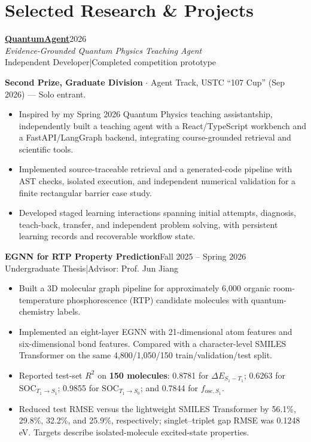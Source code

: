 \documentclass[11pt,a4paper]{article}
\newcommand{\entry}[3]{\textbf{#1}\hfill {\small #2}\\{\small #3}\par}
\begin{document}
\section{Selected Research \& Projects}
\textbf{\href{https://github.com/techandscixie2005/Quantum-Agent}{QuantumAgent}}\hfill 2026\\
\textit{Evidence-Grounded Quantum Physics Teaching Agent}\\
{\small Independent Developer\enspace |\enspace Completed competition prototype}\par
{\small\textbf{Second Prize, Graduate Division} $\cdot$ Agent Track, USTC ``107 Cup'' (Sep 2026) --- Solo entrant.}
\begin{itemize}
    \item Inspired by my Spring 2026 Quantum Physics teaching assistantship, independently built a teaching agent with a React/TypeScript workbench and a FastAPI/LangGraph backend, integrating course-grounded retrieval and scientific tools.
    \item Implemented source-traceable retrieval and a generated-code pipeline with AST checks, isolated execution, and independent numerical validation for a finite rectangular barrier case study.
    \item Developed staged learning interactions spanning initial attempts, diagnosis, teach-back, transfer, and independent problem solving, with persistent learning records and recoverable workflow state.
\end{itemize}
\vspace{5pt}
\entry{EGNN for RTP Property Prediction}{Fall 2025 -- Spring 2026}{Undergraduate Thesis\enspace |\enspace Advisor: Prof. Jun Jiang}
\begin{itemize}
    \item Built a 3D molecular graph pipeline for approximately 6,000 organic room-temperature phosphorescence (RTP) candidate molecules with quantum-chemistry labels.
    \item Implemented an eight-layer EGNN with 21-dimensional atom features and six-dimensional bond features. Compared with a character-level SMILES Transformer on the same 4,800/1,050/150 train/validation/test split.
    \item Reported test-set $R^2$ on \textbf{150 molecules}: 0.8781 for $\Delta E_{S_1-T_1}$; 0.6263 for $\mathrm{SOC}_{T_1\to S_1}$; 0.9855 for $\mathrm{SOC}_{T_1\to S_0}$; and 0.7844 for $f_{\mathrm{osc},S_1}$.
    \item Reduced test RMSE versus the lightweight SMILES Transformer by 56.1\%, 29.8\%, 32.2\%, and 25.9\%, respectively; singlet--triplet gap RMSE was 0.1248 eV. Targets describe isolated-molecule excited-state properties.
\end{itemize}
\end{document}
